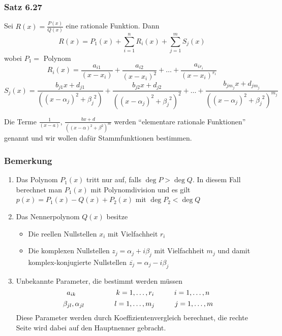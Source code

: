 \subsubsection*{Satz 6.27}
Sei $R(x)=\frac{P(x)}{Q(x)}$ eine rationale Funktion. Dann \[R(x)=P_1(x)+\sum ^{n}_{i=1}R_{i}\left( x\right) +\sum ^{m}_{j=1}S_{j}\left( x\right) \] wobei $P_1=$ Polynom \[R_{i}\left( x\right) =\dfrac {a_{i1}}{\left( x-x_{i}\right) }+\dfrac {a_{i2}}{\left( x-x_{i}\right) ^{2}}+\ldots +\dfrac {a_{ir_{i}}}{{\left( x-x_{i}\right)}^{r_i} }\]  \[S_{j}\left( x\right) =\dfrac {b_{j1}x+{d_{j1}}}{\left( \left(x-\alpha_{j}\right)^2+{\beta_{j}}^2\right) }+\dfrac {b_{j2}x+{d_{j2}}}{\left( \left(x-\alpha_{j}\right)^2+{\beta_{j}}^2\right)^2 }+\ldots +\dfrac {b_{j m_j}x+{d_{j m_j}}}{\left( \left(x-\alpha_{j}\right)^2+{\beta_{j}}^2\right)^{m_j} }\]

Die Terme $\frac{1}{(x-a)}$, $\frac{bx+d}{\left( (x-\alpha )^2 +\beta ^2\right)^m}$ werden ``elementare rationale Funktionen'' genannt und wir wollen dafür Stammfunktionen bestimmen.

\subsubsection*{Bemerkung}

\begin{enumerate}
\item Das Polynom $P_1(x)$ tritt nur auf, falls $\deg P>\deg Q$. In diesem Fall berechnet man $P_1(x)$ mit Polynomdivision und es gilt $p(x)=P_1(x)-Q(x)+P_2(x)$ mit $\deg P_2 < \deg Q$
\item Das Nennerpolynom $Q(x)$ besitze
\begin{itemize}
\item Die reellen Nullstellen $x_i$ mit Vielfachheit $r_i$
\item Die komplexen Nullstellen $z_j=\alpha _j+i\beta_j$ mit Vielfachheit $m_j$ und damit komplex-konjugierte Nullstellen $\overline{z_j}=\alpha _j-i\beta _j$
\end{itemize}
\item Unbekannte Parameter, die bestimmt werden müssen
\[a_{ik}\text{\hspace{20mm}}k=1,\dots ,r_i\text{\hspace{10mm}}i=1,\dots,n\]
\[\beta _{jl},\alpha _{jl}\text{\hspace{15mm}}l=1,\dots ,m_j\text{\hspace{10mm}}j=1,\dots,m\]
Diese Parameter werden durch Koeffizientenvergleich berechnet, die rechte Seite wird dabei auf den Hauptnenner gebracht.
\end{enumerate}
